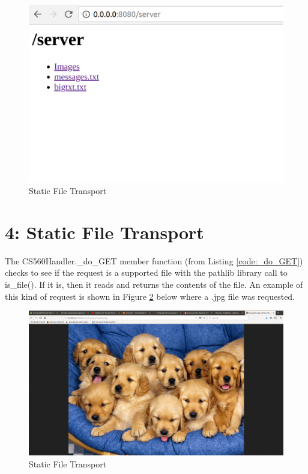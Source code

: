 \documentclass{article}
\begin{document}
	\begin{figure}[H]
		\includegraphics[scale=0.3]{dir_list.png}
		\centering
		\caption{Static File Transport}
		\label{fig:dir_list}
	\end{figure}
	
\section*{4: Static File Transport}
	The CS560Handler.\_do\_GET member function (from Listing \ref{code:_do_GET}) checks to see if the request is a supported file with the pathlib library call to is\_file(). If it is, then it reads and returns the contents of the file. An example of this kind of request is shown in Figure \ref{fig:doggo} below where a .jpg file was requested.

	\begin{figure}[H]
		\includegraphics[width=\textwidth]{doggo.png}
		\centering
		\caption{Static File Transport}
		\label{fig:doggo}
	\end{figure}
\end{document}
